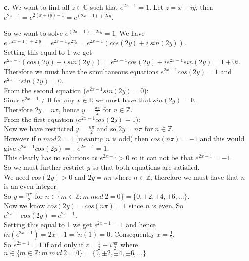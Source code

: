 \documentclass{article}
\begin{document}
{\Large\textbf{c.}} We want to find all $z\in\mathbb{C}$ such that $e^{2z - 1} = 1$. Let $z = x + iy$, then $e^{2z - 1} = e^{2(x + iy) - 1} = e^{(2x - 1) + 2iy}$.
\begin{center}
    \doublespacing
    So we want to solve $e^{(2x - 1) + 2iy} = 1$. We have $e^{(2x - 1) + 2iy} =e^{2x - 1} e^{2iy} = e^{2x - 1}(cos(2y) + i\:sin(2y))$.
    \\Setting this equal to 1 we get $e^{2x - 1}(cos(2y) + i\:sin(2y)) = e^{2x - 1}cos(2y) + i e^{2x - 1}sin(2y) = 1 + 0i$.
    \\Therefore we must have the simultaneous equations $e^{2x - 1} cos(2y) = 1$ and $e^{2x - 1} sin(2y) = 0$.
    \break
    \\From the second equation ($e^{2x - 1} sin(2y) = 0$):
    \\Since $e^{2x-1}\neq 0$ for any $x\in\mathbb{R}$ we must have that $sin(2y) = 0$.
    \\Therefore $2y = n\pi$, hence $y =\frac{n\pi}{2}$ for $n\in\mathbb{Z}$.
    \break
    \\From the first equation ($e^{2x - 1} cos(2y) = 1$):
    \\Now we have restricted $y =\frac{n\pi}{2}$ and so $2y = n\pi$ for $n\in\mathbb{Z}$.
    \\However if $n\:mod\:2 = 1$ (meaning $n$ is odd) then $cos(n\pi) = -1$ and this would give $e^{2x - 1} cos(2y) = -e^{2x - 1} = 1$.
    \\This clearly has no solutions as $e^{2x - 1} > 0$ so it can not be that $e^{2x - 1} = -1$.
    \\So we must further restrict $y$ so that both equations are satisfied.
    \\We need $cos(2y) > 0$ and $2y = n\pi$ where $n\in\mathbb{Z}$, therefore we must have that $n$ is an even integer.
    \\So $y =\frac{n\pi}{2}$ for $n\in\{m\in\mathbb{Z}:m\:mod\:2 = 0\} =\{0,\pm 2,\pm 4,\pm 6, ...\}$.
    \\Now we know $cos(2y) = cos(n\pi) = 1$ since $n$ is even. So $e^{2x - 1} cos(2y) = e^{2x - 1}$.
    \\Setting this equal to 1 we get $e^{2x - 1} = 1$ and hence $ln(e^{2x - 1}) = 2x - 1 = ln(1) = 0$. Consequently $x =\frac{1}{2}$.
    \break
    \\So $e^{2z - 1} = 1$ if and only if $z =\frac{1}{2} + i\frac{n\pi}{2}$ where $n\in\{m\in\mathbb{Z}:m\:mod\:2 = 0\} =\{0,\pm 2,\pm 4,\pm 6, ...\}$ \qedsymbol
\end{center}
\end{document}

